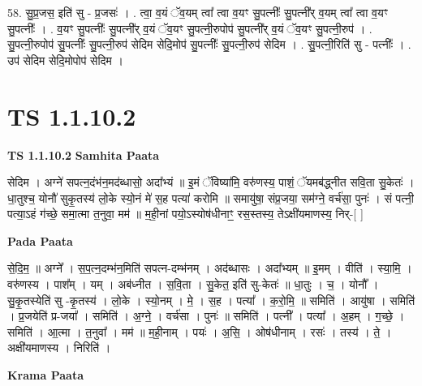 \documentclass[17pt]{extarticle}
\begin{document}
58. सु॒प्र॒जस॒ इति॑ सु - प्र॒जसः॑ । . त्वा॒ व॒यं ॅव॒यम् त्वा᳚ त्वा व॒यꣳ सु॒पत्नीः᳚ सु॒पत्नी᳚र् व॒यम् त्वा᳚ त्वा व॒यꣳ सु॒पत्नीः᳚ । . व॒यꣳ सु॒पत्नीः᳚ सु॒पत्नी᳚र् व॒यं ॅव॒यꣳ सु॒पत्नी॒रुपोप॑ सु॒पत्नी᳚र् व॒यं ॅव॒यꣳ सु॒पत्नी॒रुप॑ । . सु॒पत्नी॒रुपोप॑ सु॒पत्नीः᳚ सु॒पत्नी॒रुप॑ सेदिम सेदि॒मोप॑ सु॒पत्नीः᳚ सु॒पत्नी॒रुप॑ सेदिम । . सु॒पत्नी॒रिति॑ सु - पत्नीः᳚ । . उप॑ सेदिम सेदि॒मोपोप॑ सेदिम । \newline
\pagebreak
{}

\section{ TS 1.1.10.2 }

\textbf{TS 1.1.10.2 } \newline
\textbf{Samhita Paata} \newline

सेदिम । अग्ने॑ सपत्न॒दंभ॑न॒मद॑ब्धासो॒ अदा᳚भ्यं ॥ इ॒मं ॅविष्या॑मि॒ वरु॑णस्य॒ पाशं॒ ॅयमब॑द्ध्नीत सवि॒ता सु॒केतः॑ । धा॒तुश्च॒ योनौ॑ सुकृ॒तस्य॑ लो॒के स्यो॒नं मे॑ स॒ह पत्या॑ करोमि ॥ समायु॑षा॒ संप्र॒जया॒ सम॑ग्ने॒ वर्च॑सा॒ पुनः॑ । सं पत्नी॒ पत्या॒ऽहं ग॑च्छे॒ समा॒त्मा त॒नुवा॒ मम॑ ॥ म॒ही॒नां पयो॒ऽस्योष॑धीनाꣳ॒॒ रस॒स्तस्य॒ तेऽक्षी॑यमाणस्य॒ निर्-[ ] \newline

\textbf{Pada Paata} \newline

से॒दि॒म॒ ॥ अग्ने᳚ । स॒प॒त्न॒दम्भ॑न॒मिति॑ सपत्न-दम्भ॑नम् । अद॑ब्धासः । अदा᳚भ्यम् ॥ इ॒मम् । वीति॑ । स्या॒मि॒ । वरु॑णस्य । पाश᳚म् । यम् । अब॑ध्नीत । स॒वि॒ता । सु॒केत॒ इति॑ सु-केतः॑ ॥ धा॒तुः । च॒ । योनौ᳚ । सु॒कृ॒तस्येति॑ सु -कृ॒तस्य॑ । लो॒के । स्यो॒नम् । मे॒ । स॒ह । पत्या᳚ । क॒रो॒मि॒ ॥ समिति॑ । आयु॑षा । समिति॑ । प्र॒जयेति॑ प्र-जया᳚ । समिति॑ । अ॒ग्ने॒ । वर्च॑सा । पुनः॑ ॥ समिति॑ । पत्नी᳚ । पत्या᳚ । अ॒हम् । ग॒च्छे॒ । समिति॑ । आ॒त्मा । त॒नुवा᳚ । मम॑ ॥ म॒ही॒नाम् । पयः॑ । अ॒सि॒ । ओष॑धीनाम् । रसः॑ । तस्य॑ । ते॒ । अक्षी॑यमाणस्य । निरिति॑ ।  \newline


\textbf{Krama Paata} \newline
\end{document}

